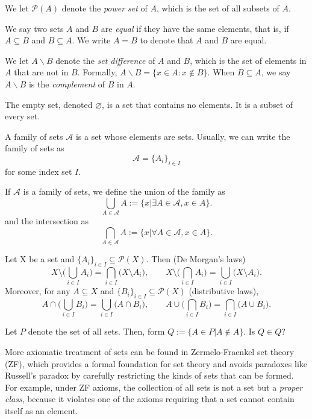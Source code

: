We let $\mathcal{P}(A)$ denote the \emph{power set} of $A$, which is the set of all subsets of $A$.

We say two sets $A$ and $B$ are \emph{equal} if they have the same elements, that is, if \(A\subseteq B\) and \(B\subseteq A\).  We write \(A=B\) to denote that $A$ and $B$ are equal.

We let $A\backslash B$ denote the \emph{set difference} of $A$ and $B$, which is the set of elements in $A$ that are not in $B$.  Formally, \(A\backslash B = \{x \in A : x \notin B\}\). When $B\subseteq A$, we say $A\backslash B$ is the \emph{complement} of $B$ in $A$.

The empty set, denoted \(\varnothing\), is a set that contains no elements.  It is a subset of every set.




\begin{definition}
A family of sets $\mathcal{A}$ is a set whose elements are sets. Usually, we can write the family of sets as $$\mathcal{A}=\{A_i\}_{i\in I}$$ for some index set $I$. 

If $\mathcal{A}$ is a family of sets, we define the union of the family as
\[\bigcup_{A\in\mathcal{A}} A:=\{x| \exists A\in\mathcal{A}, x\in A\}.\]
and the intersection as
\[\bigcap_{A\in\mathcal{A}} A:=\{x| \forall A\in\mathcal{A}, x\in A\}.\]

\end{definition}

\begin{theorem}
  Let X be a set and $\{A_i\}_{i\in I}\subseteq \mathcal{P}(X)$. Then (De Morgan's laws)
  \[
  X\setminus \biggl(\bigcup_{i\in I} A_i\biggr)=\bigcap_{i\in I}\bigl(X\setminus A_i\bigr),
  \qquad
  X\setminus \biggl(\bigcap_{i\in I} A_i\biggr)=\bigcup_{i\in I}\bigl(X\setminus A_i\bigr).
  \]
  Moreover, for any $A\subseteq X$ and $\{B_i\}_{i\in I}\subseteq \mathcal{P}(X)$ (distributive laws),
  \[
  A\cap \biggl(\bigcup_{i\in I} B_i\biggr)=\bigcup_{i\in I}\bigl(A\cap B_i\bigr),
  \qquad
  A\cup \biggl(\bigcap_{i\in I} B_i\biggr)=\bigcap_{i\in I}\bigl(A\cup B_i\bigr).
  \]
\end{theorem}

\begin{example}
  Let $P$ denote the set of all sets. Then, form $Q:=\{A\in P|A\notin A\}$. Is $Q\in Q$? 
\end{example}

More axiomatic treatment of sets can be found in Zermelo-Fraenkel set theory (ZF), which provides a formal foundation for set theory and avoids paradoxes like Russell's paradox by carefully restricting the kinds of sets that can be formed. For example, under ZF axioms, the collection of all sets is not a set but a \emph{proper class}, because it violates one of the axioms requiring that a set cannot contain itself as an element.



